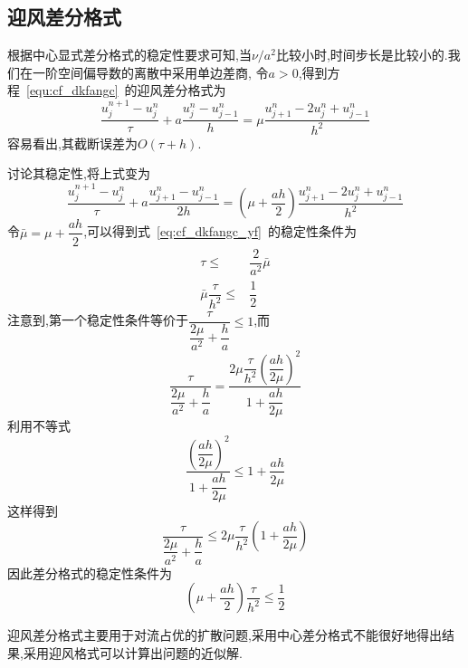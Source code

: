 \subsection{迎风差分格式}
根据中心显式差分格式的稳定性要求可知,当$\nu/a^2$比较小时,时间步长是比较小的.我们在一阶空间偏导数的离散中采用单边差商,
令$a>0$,得到方程~\ref{equ:cf_dkfangc}~的迎风差分格式为
\begin{equation}\label{eq:cf_dkfangc_yf}
 \dfrac{u_j^{n+1}-u_j^n}{\tau}+a\dfrac{u_j^n-u_{j-1}^n}{h}=\mu\dfrac{u_{j+1}^n-2u_j^n+u_{j-1}^{n}}{h^2}
\end{equation}
容易看出,其截断误差为$O(\tau+h)$.\par
讨论其稳定性,将上式变为
\begin{equation}
 \dfrac{u_j^{n+1}-u_j^n}{\tau}+a\dfrac{u_{j+1}^n-u_{j-1}^n}{2h} = \left(\mu+\dfrac{ah}{2}\right)
 \dfrac{u_{j+1}^{n}-2u_j^n+u_{j-1}^n}{h^2}
\end{equation}
令$\bar{\mu}=\mu+\dfrac{ah}{2}$,可以得到式~\ref{eq:cf_dkfangc_yf}~的稳定性条件为
\begin{equation*}
\begin{split}
  \tau\leq&\dfrac{2}{a^2}\bar{\mu} \\[0.7em]
  \bar{\mu}\dfrac{\tau}{h^2}\leq&\dfrac{1}{2}
\end{split}
\end{equation*}
注意到,第一个稳定性条件等价于$\dfrac{\tau}{\dfrac{2\mu}{a^2}+\dfrac{h}{a}}\leq 1$,而
\begin{equation*}
\dfrac{\tau}{\dfrac{2\mu}{a^2}+\dfrac{h}{a}}=\dfrac{2\mu\dfrac{\tau}{h^2}\left(\dfrac{ah}{2\mu}\right)^2}{1+\dfrac{ah}{2\mu}}
\end{equation*}
利用不等式
\begin{equation*}
\dfrac{\left(\dfrac{ah}{2\mu}\right)^2}{1+\dfrac{ah}{2\mu}}\leq 1+\dfrac{ah}{2\mu}
\end{equation*}
这样得到
\begin{equation*}
\dfrac{\tau}{\dfrac{2\mu}{a^2}+\dfrac{h}{a}}\leq 2\mu\dfrac{\tau}{h^2}\left(1+\dfrac{ah}{2\mu}\right)
\end{equation*}
因此差分格式的稳定性条件为
\begin{equation}
 \left(\mu+\dfrac{ah}{2}\right)\dfrac{\tau}{h^2}\leq\dfrac{1}{2}
\end{equation}\par
迎风差分格式主要用于对流占优的扩散问题,采用中心差分格式不能很好地得出结果,采用迎风格式可以计算出问题的近似解.
